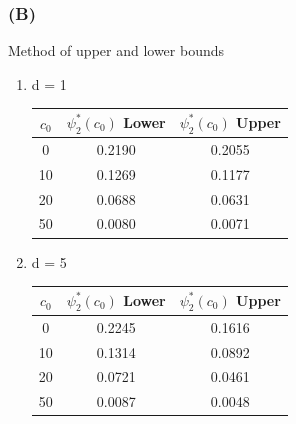 \documentclass[titlepage]{article}
\begin{document}
	\subsubsection{(B)}
	Method of upper and lower bounds
	\begin{enumerate}
		\item d = 1
	
			\begin{tabular}{ |c|c|c|} 
				\hline
				$c_0$ & $\psi_2^*(c_0)$ Lower & $ \psi_2^*(c_0) $ Upper \\ 
				\hline
				0 &  0.2190 & 0.2055\\ 
				10 & 0.1269 & 0.1177\\ 
				20 & 0.0688 & 0.0631\\ 
				50 & 0.0080 & 0.0071\\
				\hline
			\end{tabular}
		
		\item d = 5
		
			\begin{tabular}{ |c|c|c|} 
				\hline
				$c_0$ & $\psi_2^*(c_0)$ Lower & $ \psi_2^*(c_0) $ Upper \\ 
				\hline
				0 &  0.2245 & 0.1616\\ 
				10 & 0.1314 & 0.0892\\ 
				20 & 0.0721 & 0.0461\\ 
				50 & 0.0087 & 0.0048\\
				\hline
			\end{tabular}
	\end{enumerate}
	
\end{document}

